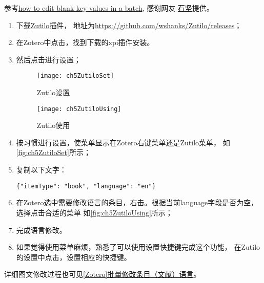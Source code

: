 \documentclass[cn,11pt,chinese]{elegantbook}
\begin{document}
\begin{enumerate}
						参考\href{https://forums.zotero.org/discussion/86911/how-to-edit-blank-key-values-in-a-batch#latest}
						{how to edit blank key values in a batch},
						感谢网友 \href{https://www.zhihu.com/people/you-hao-zhai-jian-bu-zhai}{石坚}提供。
					\begin{enumerate}[(1)]
					    \item 下载\href{https://github.com/wshanks/Zutilo/releases}{Zutilo}插件，
						地址为\href{https://github.com/wshanks/Zutilo/releases}
						{https://github.com/wshanks/Zutilo/releases}；
						\item 在Zotero中点击，找到下载的xpi插件安装。
						\item 然后点击进行设置；
						
							\begin{figure}[htbp]
								\centering
								\texttt{[image: ch5ZutiloSet]}
								\caption{Zutilo设置}
								\label{fig:ch5ZutiloSet}
							\end{figure}
							\begin{figure}[htbp]
								\centering
								\texttt{[image: ch5ZutiloUsing]}
								\caption{Zutilo使用}
								\label{fig:ch5ZutiloUsing}
							\end{figure}
						\item 按习惯进行设置，使菜单显示在Zotero右键菜单还是Zutilo菜单，
							如\autoref{fig:ch5ZutiloSet}所示；
						\item 复制以下文字：

						\verb|{"itemType": "book", "language": "en"}|

						\item 在Zotero选中需要修改语言的条目，右击。根据当前language字段是否为空，选择点击合适的菜单
							如\autoref{fig:ch5ZutiloUsing}所示；
						\item 完成语言修改。

						\item 如果觉得使用菜单麻烦，熟悉了可以使用设置快捷键完成这个功能，
						在Zutilo的设置中点击，设置相应的快捷键。
				  \end{enumerate}
		\end{enumerate}
		详细图文修改过程也可见\href{https://zhuanlan.zhihu.com/p/341989158}{[Zotero]批量修改条目（文献）语言}。
\end{document}

